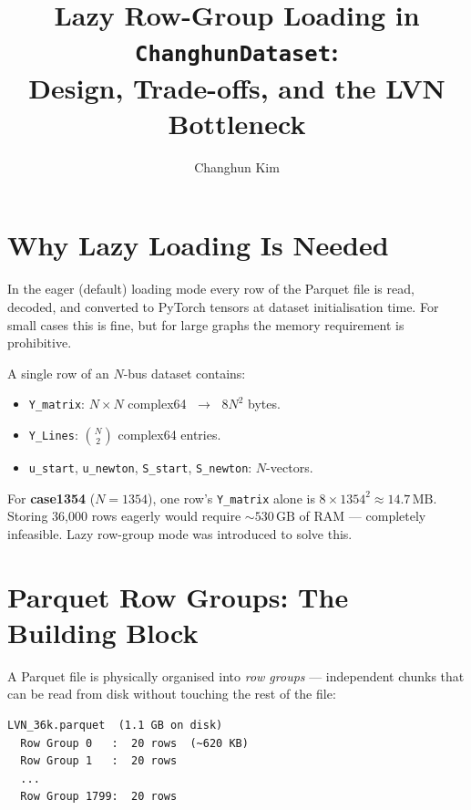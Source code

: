 \documentclass{article}
\title{Lazy Row-Group Loading in \texttt{ChanghunDataset}:\\
  Design, Trade-offs, and the LVN Bottleneck}
\author{Changhun Kim}
\begin{document}
\maketitle

\section{Why Lazy Loading Is Needed}

In the eager (default) loading mode every row of the Parquet file is read,
decoded, and converted to PyTorch tensors at dataset initialisation time.
For small cases this is fine, but for large graphs the memory requirement is
prohibitive.

A single row of an $N$-bus dataset contains:
\begin{itemize}[noitemsep]
  \item \texttt{Y\_matrix}: $N \times N$ complex64 $\;\to\;$ $8N^2$ bytes.
  \item \texttt{Y\_Lines}: $\binom{N}{2}$ complex64 entries.
  \item \texttt{u\_start}, \texttt{u\_newton}, \texttt{S\_start},
    \texttt{S\_newton}: $N$-vectors.
\end{itemize}

For \textbf{case1354} ($N=1354$), one row's \texttt{Y\_matrix} alone is
$8 \times 1354^2 \approx 14.7\,\mathrm{MB}$.  Storing 36{,}000 rows eagerly
would require $\sim\!530\,\mathrm{GB}$ of RAM — completely infeasible.
Lazy row-group mode was introduced to solve this.

\section{Parquet Row Groups: The Building Block}

A Parquet file is physically organised into \emph{row groups} — independent
chunks that can be read from disk without touching the rest of the file:

\begin{lstlisting}
LVN_36k.parquet  (1.1 GB on disk)
  Row Group 0   :  20 rows  (~620 KB)
  Row Group 1   :  20 rows
  ...
  Row Group 1799:  20 rows
\end{lstlisting}
\end{document}
